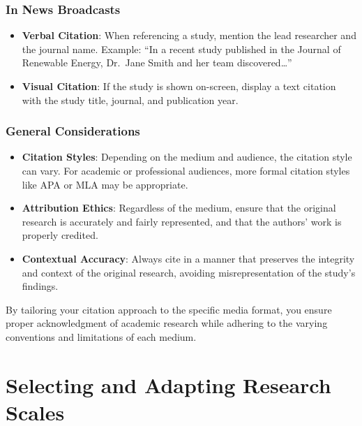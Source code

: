 \documentclass[
]{book}
\begin{document}
\hypertarget{in-news-broadcasts}{%
\subsection*{In News Broadcasts}\label{in-news-broadcasts}}

\begin{itemize}
\item
  \textbf{Verbal Citation}: When referencing a study, mention the lead researcher and the journal name. Example: ``In a recent study published in the Journal of Renewable Energy, Dr.~Jane Smith and her team discovered\ldots{}''
\item
  \textbf{Visual Citation}: If the study is shown on-screen, display a text citation with the study title, journal, and publication year.
\end{itemize}

\hypertarget{general-considerations}{%
\subsection*{General Considerations}\label{general-considerations}}

\begin{itemize}
\item
  \textbf{Citation Styles}: Depending on the medium and audience, the citation style can vary. For academic or professional audiences, more formal citation styles like APA or MLA may be appropriate.
\item
  \textbf{Attribution Ethics}: Regardless of the medium, ensure that the original research is accurately and fairly represented, and that the authors' work is properly credited.
\item
  \textbf{Contextual Accuracy}: Always cite in a manner that preserves the integrity and context of the original research, avoiding misrepresentation of the study's findings.
\end{itemize}

By tailoring your citation approach to the specific media format, you ensure proper acknowledgment of academic research while adhering to the varying conventions and limitations of each medium.

\hypertarget{selecting-and-adapting-research-scales}{%
\chapter{Selecting and Adapting Research Scales}\label{selecting-and-adapting-research-scales}}
\end{document}
